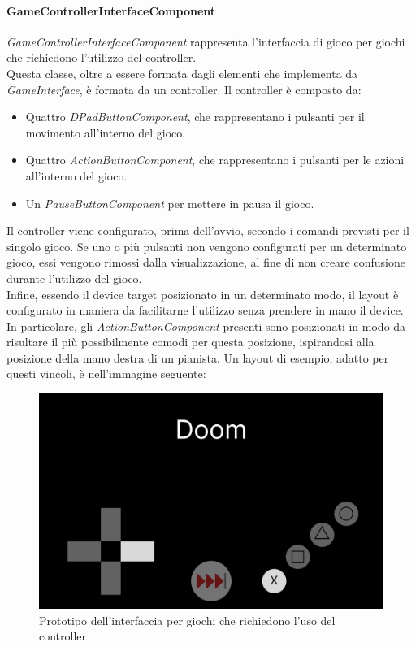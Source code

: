 \paragraph{GameControllerInterfaceComponent}
\label{paragraph:gamecontrollerinterfacecomponent}
\emph{GameControllerInterfaceComponent} rappresenta l'interfaccia di gioco per giochi che richiedono l'utilizzo del controller.\\
Questa classe, oltre a essere formata dagli elementi che implementa da \emph{GameInterface}, è formata da un controller. Il controller è composto da:
\begin{itemize}
    \item Quattro \emph{DPadButtonComponent}, che rappresentano i pulsanti per il movimento all'interno del gioco.
    \item Quattro \emph{ActionButtonComponent}, che rappresentano i pulsanti per le azioni\\ all'interno del gioco.
    \item Un \emph{PauseButtonComponent} per mettere in pausa il gioco.
\end{itemize}
Il controller viene configurato, prima dell'avvio, secondo i comandi previsti per il singolo gioco. Se uno o più pulsanti non vengono configurati per un determinato gioco, essi vengono rimossi dalla visualizzazione, al fine di non creare confusione durante l'utilizzo del gioco.\\
Infine, essendo il device target posizionato in un determinato modo, il layout è configurato in maniera da facilitarne l'utilizzo senza prendere in mano il device.\\
In particolare, gli \emph{ActionButtonComponent} presenti sono posizionati in modo da risultare il più possibilmente comodi per questa posizione, ispirandosi alla posizione della mano destra di un pianista.
Un layout di esempio, adatto per questi vincoli, è nell'immagine seguente:
\begin{figure}[h]
    \centering
    \includegraphics[width=340pt]{images/prog/ControllerMockup.png}
    \caption{Prototipo dell'interfaccia per giochi che richiedono l'uso del controller}
    \label{fig:controller}
\end{figure}

